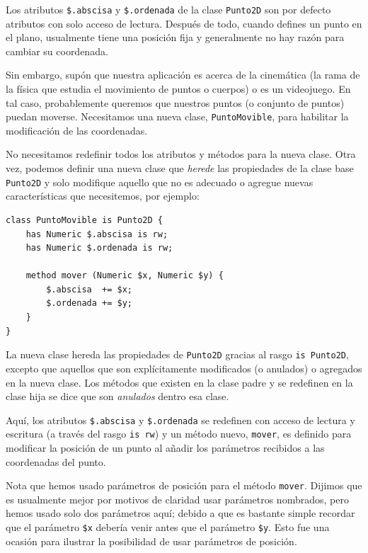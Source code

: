 Los atributos \verb|$.abscisa| y \verb|$.ordenada| de la 
clase {\tt Punto2D} son por defecto atributos con solo
acceso de lectura. Después de todo, cuando defines un punto
en el plano, usualmente tiene una posición fija y generalmente 
no hay razón para cambiar su coordenada.

Sin embargo, supón que nuestra aplicación es acerca de la
cinemática (la rama de la física que estudia el movimiento
de puntos o cuerpos) o es un videojuego. En tal caso, probablemente
queremos que nuestros puntos (o conjunto de puntos) puedan 
moverse. Necesitamos una nueva clase, {\tt PuntoMovible},
para habilitar la modificación de las coordenadas.

No necesitamos redefinir todos los atributos y métodos para
la nueva clase. Otra vez, podemos definir una nueva clase
que \emph{herede} las propiedades de la clase base {\tt Punto2D}
y solo modifique aquello que no es adecuado o agregue 
nuevas características que necesitemos, por ejemplo:

\begin{lstlisting}
class PuntoMovible is Punto2D {
    has Numeric $.abscisa is rw;
    has Numeric $.ordenada is rw;
    
    method mover (Numeric $x, Numeric $y) {
        $.abscisa  += $x;
        $.ordenada += $y;
    }
}
\end{lstlisting}

La nueva clase hereda las propiedades de {\tt Punto2D} 
gracias al rasgo {\tt is Punto2D}, excepto que aquellos
que son explícitamente modificados (o anulados) o agregados
en la nueva clase. Los métodos que existen en la clase padre
y se redefinen en la clase hija se dice que son \emph{anulados}
dentro esa clase.

Aquí, los atributos \verb|$.abscisa| y \verb|$.ordenada| 
se redefinen con acceso de lectura y escritura (a través del rasgo
{\tt is rw}) y un método nuevo, {\tt mover}, es definido para modificar
la posición de un punto al añadir los parámetros recibidos a las
coordenadas del punto.

Nota que hemos usado parámetros de posición para el método {\tt mover}. 
Dijimos que es usualmente mejor por motivos de claridad usar parámetros
nombrados, pero hemos usado solo dos parámetros aquí; debido a que 
es bastante simple recordar que el parámetro \verb|$x| debería venir
antes que el parámetro \verb|$y|. Esto fue una ocasión para ilustrar la
posibilidad de usar parámetros de posición.

